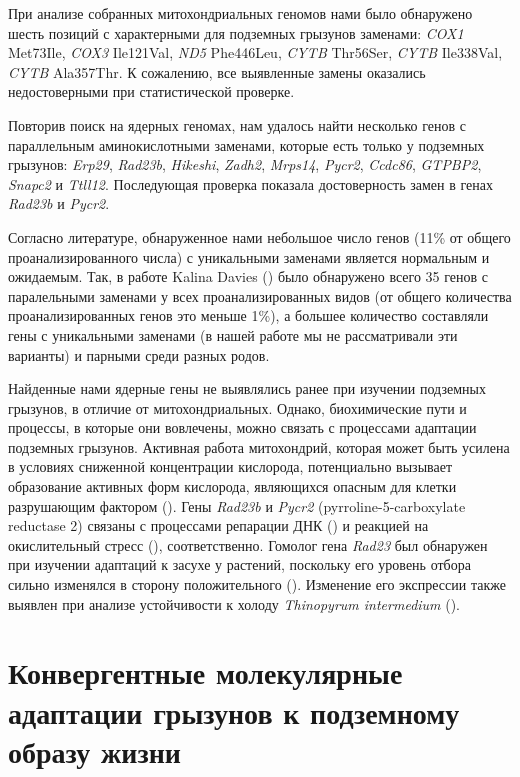 При анализе собранных митохондриальных геномов нами было обнаружено шесть позиций с характерными для подземных грызунов заменами: \textit{COX1} Met73Ile, \textit{COX3} Ile121Val, \textit{ND5} Phe446Leu, \textit{CYTB} Thr56Ser, \textit{CYTB} Ile338Val, \textit{CYTB} Ala357Thr. К сожалению, все выявленные замены оказались недостоверными при статистической проверке. 

 
Повторив поиск на ядерных геномах, нам удалось найти несколько генов с параллельным аминокислотными заменами, которые есть только у подземных грызунов: \textit{Erp29}, \textit{Rad23b}, \textit{Hikeshi}, \textit{Zadh2}, \textit{Mrps14}, \textit{Pycr2}, \textit{Ccdc86}, \textit{GTPBP2}, \textit{Snapc2} и \textit{Ttll12}. Последующая проверка показала достоверность замен в генах \textit{Rad23b} и \textit{Pycr2}.
            
Согласно литературе, обнаруженное нами небольшое число генов (11\% от общего проанализированного числа) с уникальными заменами  является нормальным и ожидаемым. Так, в работе Kalina Davies (\cite{Davies2018}) было обнаружено всего 35 генов с паралельными заменами у всех проанализированных видов (от общего количества проанализированных генов это меньше 1\%), а большее количество составляли гены с уникальными заменами (в нашей работе мы не рассматривали эти варианты) и парными среди разных родов. 

Найденные нами ядерные гены не выявлялись ранее при изучении подземных грызунов, в отличие от митохондриальных. Однако, биохимические пути и процессы, в которые они вовлечены, можно связать с процессами адаптации подземных грызунов. Активная работа митохондрий, которая может быть усилена в условиях сниженной концентрации кислорода, потенциально вызывает образование активных форм кислорода, являющихся опасным для клетки разрушающим фактором (\cite{Turrens2003}). Гены \textit{Rad23b} и \textit{Pycr2} (pyrroline-5-carboxylate reductase 2) связаны с процессами репарации ДНК (\cite{Pohjoismaki2012}) и реакцией на окислительный стресс (\cite{Kuo2015}), соответственно. Гомолог гена \textit{Rad23} был обнаружен при изучении адаптаций к засухе у растений, поскольку его уровень отбора сильно изменялся в сторону положительного (\cite{Zhang2013b}). Изменение его экспрессии также выявлен при анализе устойчивости к холоду \textit{Thinopyrum intermedium} (\cite{Jaikumar2020}).   
       

\section{Конвергентные молекулярные адаптации грызунов к подземному образу жизни}

